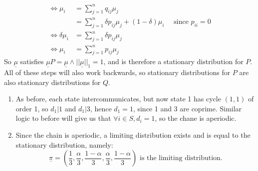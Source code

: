 \documentclass{article}
\begin{document}
\begin{enumerate}
\begin{enumerate}
\begin{align*}
\iff \mu_i &= \sum^n_{j=1}q_{ij}\mu_j\\
&= \sum^n_{j=1}\delta p_{ij}\mu_j + (1-\delta)\mu_i \quad \mbox{ since $p_{ii}=0$}\\
\iff \delta \mu_i &= \sum^n_{j=1}\delta p_{ij} \mu_j\\
\iff \mu_i &= \sum^n_{j=1}p_{ij}\mu_j
\end{align*}
So $\underline{\mu}$ satisfies $\underline{\mu}P = \underline{\mu} \wedge ||\underline{\mu}||_1 = 1$, and is therefore a stationary distribution for $P$. All of these steps will also work backwards, so stationary distributions for $P$ are also stationary distributions for $Q$.
\begin{enumerate}
\item
As before, each state intercommunicates, but now state 1 has cycle $(1,1)$ of order 1, so $d_1|1$ and $d_1 | 3$, hence $d_1 =1$, since 1 and 3 are coprime. Similar logic to before will give us that $\forall i \in S, d_i = 1$, so the chane is aperiodic.
\item
Since the chain is aperiodic, a limiting distribution exists and is equal to the stationary distribution, namely:
$$
\underline{\pi} = \left(\frac{1}{3},\frac{\alpha}{3},\frac{1-\alpha}{3},\frac{\alpha}{3},\frac{1-\alpha}{3}\right) \mbox{ is the limiting distribution.}
$$
\end{enumerate}

\end{enumerate}
\end{enumerate}
\end{document}
